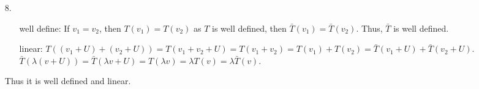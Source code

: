 \documentclass{article}
\begin{document}
\begin{itemize}
\begin{itemize}
    \end{itemize}
    \item [8.]\
    \begin{itemize}
        \item [well define:] If \(v_1=v_2\), then \(T(v_1)=T(v_2)\) as \(T\) is well defined, then \(\bar{T}(v_1)=\bar{T}(v_2)\). Thus, \(\bar{T}\) is well defined.
        \item [linear:] \(T((v_1+U)+(v_2+U))=T(v_1+v_2+U)=T(v_1+v_2)=T(v_1)+T(v_2)=\bar{T}(v_1+U)+\bar{T}(v_2+U)\).\\
                        \(\bar{T}(\lambda (v+U))=\bar{T}(\lambda v +U)=T(\lambda v)=\lambda T(v)=\lambda \bar{T}(v)\).\\
                        
            
    \end{itemize}
    Thus it is well defined and linear.
\end{itemize}
\end{document}
